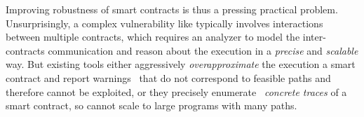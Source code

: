 
Improving robustness of smart contracts is thus a pressing practical problem. Unsurprisingly,
 a complex vulnerability like \reentrancy typically involves interactions between multiple contracts, 
 which requires an analyzer to model the inter-contracts communication 
 and reason about the execution in a \emph{precise} and \emph{scalable} way.
 But existing tools either aggressively \emph{overapproximate} the execution a smart contract and report warnings~\cite{securify,madmax} that do not correspond to 
 feasible paths and therefore cannot be exploited, or they precisely
 enumerate~\cite{teether,contractfuzzer,oyente} \emph{concrete traces} of a smart
 contract, so cannot scale to large programs with many paths.



